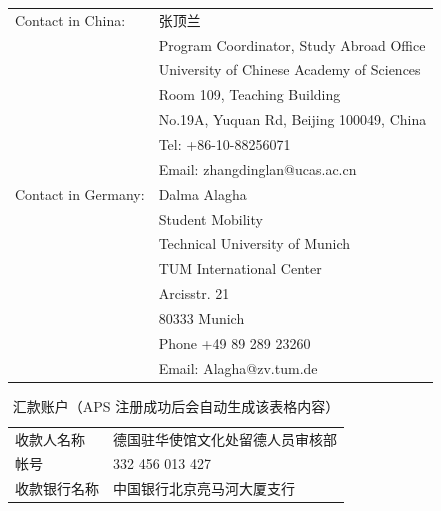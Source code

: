 \documentclass{article}
\begin{document}
\begin{table}[!htbp]
\centering
\begin{tabular}{ll}
\toprule
Contact in China: & 张顶兰 \\
& Program Coordinator, Study Abroad Office \\
& University of Chinese Academy of Sciences \\
& Room 109, Teaching Building \\
& No.19A, Yuquan Rd, Beijing 100049, China \\
& Tel: +86-10-88256071 \\
& Email: zhangdinglan@ucas.ac.cn \\ \midrule
Contact in Germany: & Dalma Alagha \\
& Student Mobility \\
& Technical University of Munich\\
& TUM International Center \\
& Arcisstr. 21 \\
& 80333 Munich \\
& Phone +49 89 289 23260 \\
& Email: Alagha@zv.tum.de \\ \bottomrule
\end{tabular}
\end{table}

\newpage

\begin{table}[htbp]
  \caption{汇款账户（APS 注册成功后会自动生成该表格内容）}
  \label{tb:bank-account}
  \centering
  \begin{tabular}{ll}
    \toprule
    收款人名称 & 德国驻华使馆文化处留德人员审核部 \\
    帐号 & 332 456 013 427 \\
    收款银行名称 & 中国银行北京亮马河大厦支行 \\
    \bottomrule
  \end{tabular}
\end{table}
\end{document}
